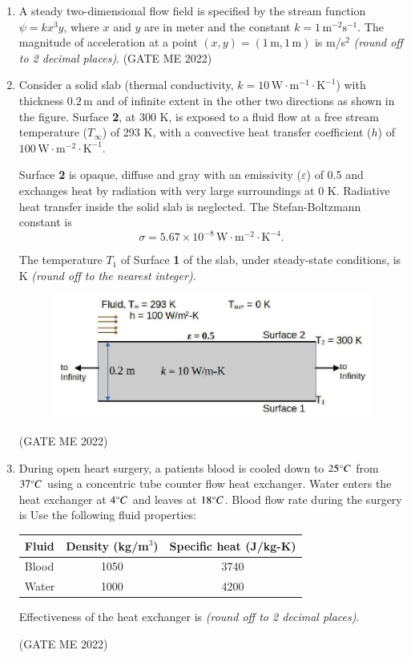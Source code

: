 \documentclass[journal]{IEEEtran}
\numberwithin{equation}{enumi}
\numberwithin{figure}{enumi}
\begin{document}
\begin{enumerate}
\item A steady two-dimensional flow field is specified by the stream function
$\psi = kx^3 y$,
where \( x \) and \( y \) are in meter and the constant \( k = 1 \, \text{m}^{-2}\text{s}^{-1} \). The magnitude of acceleration at a point \( (x, y) = (1\, \text{m}, 1\, \text{m}) \) is \underline{\hspace{2cm}} m/s\(^2\) \textit{(round off to 2 decimal places)}.
\hfill{(GATE ME 2022)}
\item Consider a solid slab (thermal conductivity, \( k = 10 \, \text{W}\cdot\text{m}^{-1}\cdot\text{K}^{-1} \)) with thickness \( 0.2 \, \text{m} \) and of infinite extent in the other two directions as shown in the figure. Surface \textbf{2}, at 300 K, is exposed to a fluid flow at a free stream temperature (\( T_{\infty} \)) of 293 K, with a convective heat transfer coefficient (\( h \)) of \( 100 \, \text{W}\cdot\text{m}^{-2}\cdot\text{K}^{-1} \). 

Surface \textbf{2} is opaque, diffuse and gray with an emissivity (\( \varepsilon \)) of 0.5 and exchanges heat by radiation with very large surroundings at 0 K. Radiative heat transfer inside the solid slab is neglected. The Stefan-Boltzmann constant is 
\[
\sigma = 5.67 \times 10^{-8} \, \text{W}\cdot\text{m}^{-2}\cdot\text{K}^{-4}.
\]

The temperature \( T_1 \) of Surface \textbf{1} of the slab, under steady-state conditions, is \underline{\hspace{2cm}} K \textit{(round off to the nearest integer)}.
\begin{figure}[H]
    \centering
    \includegraphics[width = 0.5\columnwidth]{figs/fig4.19.png}
    \caption*{}
    \label{fig:Q64}
    \end{figure}
\hfill{(GATE ME 2022)}

 \item During open heart surgery, a patients blood is cooled down to $25 \degree C $ 
from $37 \degree C$ using a concentric tube counter flow heat exchanger. 
Water enters the heat exchanger at $4 \degree C$ and leaves at $18 \degree C $. 
Blood flow rate during the surgery is
Use the following fluid properties:

\begin{center}
\begin{tabular}{|l|c|c|}
\hline
\textbf{Fluid} & \textbf{Density (kg/m\(^3\))} & \textbf{Specific heat (J/kg-K)} \\
\hline
Blood & 1050 & 3740 \\
\hline
Water & 1000 & 4200 \\
\hline
\end{tabular}
\end{center}
 
Effectiveness of the heat exchanger is \underline{\hspace{2cm}} \textit{(round off to 2 decimal places)}.

\hfill{(GATE ME 2022)}
\end{enumerate}
\end{document}
